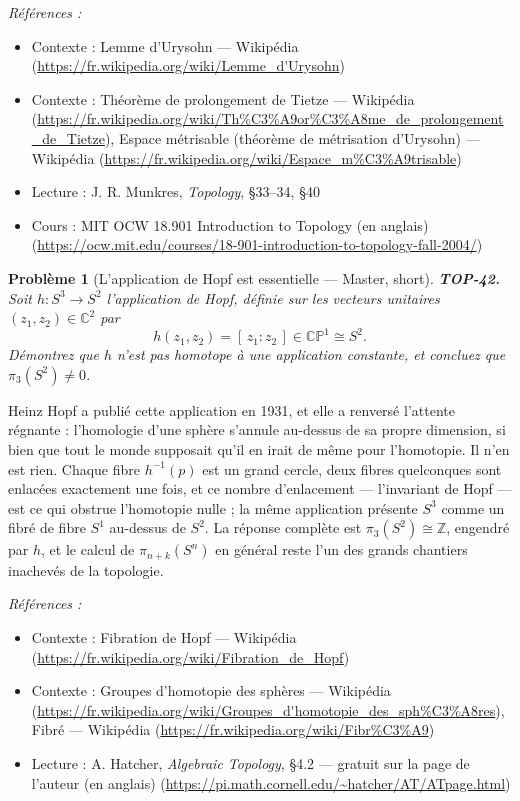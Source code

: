 \documentclass[11pt]{article}
\newtheorem{problem}{Problème}
\newenvironment{refs}{\par\small\noindent\emph{Références :}\begin{itemize}\setlength\itemsep{0pt}}{\end{itemize}\normalsize}
\begin{document}
\begin{refs}
\item Contexte : Lemme d'Urysohn --- Wikipédia (\url{https://fr.wikipedia.org/wiki/Lemme_d'Urysohn})
\item Contexte : Théorème de prolongement de Tietze --- Wikipédia (\url{https://fr.wikipedia.org/wiki/Th%C3%A9or%C3%A8me_de_prolongement_de_Tietze}), Espace métrisable (théorème de métrisation d'Urysohn) --- Wikipédia (\url{https://fr.wikipedia.org/wiki/Espace_m%C3%A9trisable})
\item Lecture : J. R. Munkres, \textit{Topology}, \S{}33--34, \S{}40
\item Cours : MIT OCW 18.901 Introduction to Topology (en anglais) (\url{https://ocw.mit.edu/courses/18-901-introduction-to-topology-fall-2004/})
\end{refs}

\bigskip

\begin{problem}[{L'application de Hopf est essentielle --- Master, short}]
\textbf{TOP-42.} Soit $ h : S^3 \to S^2 $ l'application de Hopf, définie sur les
vecteurs unitaires $ (z_1, z_2) \in \mathbb{C}^2 $ par
\[ h(z_1, z_2) = [\, z_1 : z_2 \,] \in \mathbb{CP}^1 \cong S^2 . \]
Démontrez que $ h $ n'est pas homotope à une application constante, et concluez que
$ \pi_3(S^2) \neq 0 $.
\end{problem}

\noindent Heinz Hopf a publié cette application en 1931, et elle a renversé l'attente régnante :
l'homologie d'une sphère s'annule au-dessus de sa propre dimension, si bien que tout le monde supposait
qu'il en irait de même pour l'homotopie. Il n'en est rien. Chaque fibre $ h^{-1}(p) $ est un grand
cercle, deux fibres quelconques sont enlacées exactement une fois, et ce nombre d'enlacement ---
l'invariant de Hopf --- est ce qui obstrue l'homotopie nulle ; la même application présente $ S^3 $ comme
un fibré de fibre $ S^1 $ au-dessus de $ S^2 $. La réponse complète est
$ \pi_3(S^2) \cong \mathbb{Z} $, engendré par $ h $, et le calcul de $ \pi_{n+k}(S^n) $ en général
reste l'un des grands chantiers inachevés de la topologie.

\begin{refs}
\item Contexte : Fibration de Hopf --- Wikipédia (\url{https://fr.wikipedia.org/wiki/Fibration_de_Hopf})
\item Contexte : Groupes d'homotopie des sphères --- Wikipédia (\url{https://fr.wikipedia.org/wiki/Groupes_d'homotopie_des_sph%C3%A8res}), Fibré --- Wikipédia (\url{https://fr.wikipedia.org/wiki/Fibr%C3%A9})
\item Lecture : A. Hatcher, \textit{Algebraic Topology}, \S{}4.2 --- gratuit sur la page de l'auteur (en anglais) (\url{https://pi.math.cornell.edu/~hatcher/AT/ATpage.html})
\end{refs}
\end{document}
